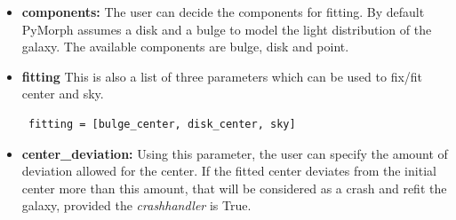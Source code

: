\documentclass[a4paper,10pt]{article}
\begin{document}
\begin{itemize}
\item \textbf{components:} The user can decide the components for fitting. By default PyMorph assumes a disk and a bulge to model the light distribution of the galaxy. The available components are bulge, disk and point.
\item \textbf{fitting} This is also a list of three parameters which can be used to fix/fit center and sky.
\begin{verbatim} fitting = [bulge_center, disk_center, sky]
\end{verbatim}
% 

\item \textbf{center\_deviation:} Using this parameter, the user can specify the amount of deviation allowed for the center. If the fitted center deviates from the initial center more than this amount, that will be considered as a crash and refit the galaxy, provided the \textit{crashhandler} is True.

\end{itemize}
\end{document}
